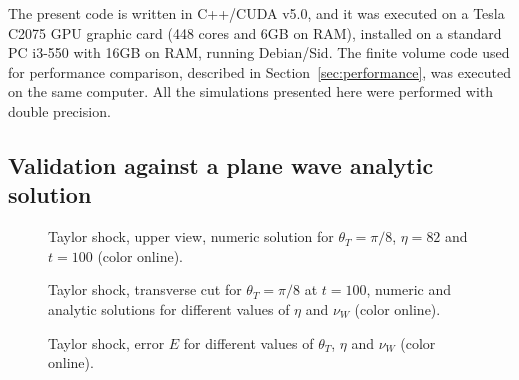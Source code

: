 The present code is written in C++/CUDA v5.0, and it was executed on a Tesla C2075 GPU graphic card (448 cores and 6GB on RAM), installed on a standard PC i3-550 with 16GB on RAM, running Debian/Sid. 
The finite volume code used for performance comparison, described in Section~\ref{sec:performance}, was executed on the same computer.
All the simulations presented here were performed with double precision.  

\subsection{Validation against a plane wave analytic solution}
\label{sec:agains-analyt-solut}

\begin{figure}[htb] 
\centering 
{} 
\caption{Taylor shock, upper view, numeric solution for $\theta_T = \pi/8$, $\eta=82$ and $t=100$ (color online).}
\label{fig:taylor-upper}
\end{figure}

\begin{figure}[htb] 
\centering 
{} 
\caption{Taylor shock, transverse cut for $\theta_T=\pi/8$ at
  $t=100$, numeric and analytic solutions for different values
  of $\eta$ and $\nu_W$ (color online).}
\label{fig:taylor-transverse}
\end{figure}

\begin{figure}[htb] 
\centering 
{} 
\caption{Taylor shock, error $E$ for different values of
  $\theta_T$, $\eta$ and $\nu_W$ (color online).}
\label{fig:taylor-error}
\end{figure}


